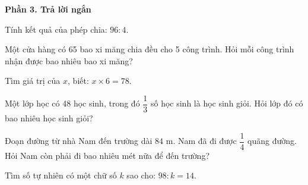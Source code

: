 \textbf{Phần 3. Trả lời ngắn}

\begin{ex} %
Tính kết quả của phép chia: $96 : 4$.
\end{ex}

\begin{ex} %
Một cửa hàng có 65 bao xi măng chia đều cho 5 công trình. Hỏi mỗi công trình nhận được bao nhiêu bao xi măng?
\end{ex}

\begin{ex} %
Tìm giá trị của $x$, biết: $x \times 6 = 78$.
\end{ex}

\begin{ex} %
Một lớp học có 48 học sinh, trong đó $\dfrac{1}{3}$ số học sinh là học sinh giỏi. Hỏi lớp đó có bao nhiêu học sinh giỏi?
\end{ex}

\begin{ex} %
Đoạn đường từ nhà Nam đến trường dài $84\text{ m}$. Nam đã đi được $\dfrac{1}{4}$ quãng đường. Hỏi Nam còn phải đi bao nhiêu mét nữa để đến trường?
\end{ex}

\begin{ex} %
Tìm số tự nhiên có một chữ số $k$ sao cho: $98 : k = 14$.
\end{ex}
